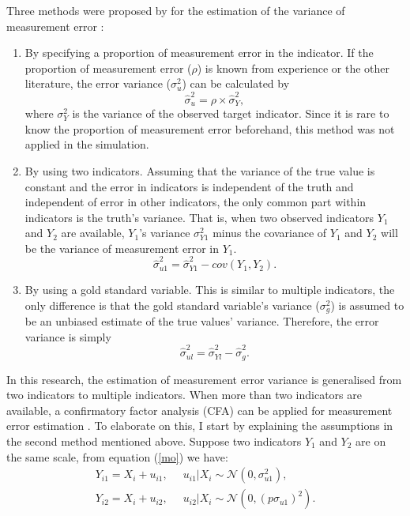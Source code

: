 \documentclass[oneside,a4paper]{article}
\begin{document}
Three methods were proposed by  for the estimation of the variance of measurement error : 
\begin{enumerate}
\item By specifying a proportion of measurement error in the indicator. If the proportion of measurement error ($\rho$) is known from experience or the other literature, the error variance ($\sigma_{u}^2$) can be calculated by 
\begin{equation}
\hat{\sigma}_{u}^2 = \rho \times \hat{\sigma}_Y^2,
\end{equation}
where $\sigma_Y^2$ is the variance of the observed target indicator. Since it is rare to know the proportion of measurement error beforehand, this method was not applied in the simulation.
\item By using two indicators. Assuming that the variance of the true value is constant and the error in indicators is independent of the truth and independent of error in other indicators, the only common part within indicators is the truth’s variance. That is, when two observed indicators $Y_1$ and $Y_2$ are available, $Y_1$’s variance $\sigma_{Y1}^2 $ minus the covariance of  $Y_1$ and $Y_2$ will be the variance of measurement error in $Y_1$.
\begin{equation}
\hat{\sigma}_{u1}^2 = \hat{\sigma}_{Y1}^2 - cov(Y_{1},Y_{2}).
\end{equation}
\item By using a gold standard variable. This is similar to multiple indicators, the only difference is that the gold standard variable’s variance ($\sigma_g^2$)  is assumed to be an unbiased estimate of the true values’ variance. Therefore, the error variance is simply
\begin{equation}
\hat{\sigma}_{ul}^2 = \hat{\sigma}_{Yl}^2 - \hat{\sigma}_g^2.
\end{equation}
\end{enumerate}
In this research, the estimation of measurement error variance is generalised from two indicators to multiple indicators. When more than two indicators are available, a confirmatory factor analysis (CFA) can be applied for measurement error estimation \cite{SEM}. To elaborate on this, I start by explaining the assumptions in the second method mentioned above. Suppose two indicators $Y_1$ and $Y_2$ are on the same scale, from equation (\ref{mo}) we have:
\begin{equation}\label{ind}
\begin{split}
Y_{i1} = X_{i}+ u_{i1}, \; \;
&u_{i1} | X_{i}  \sim \mathcal{N}(0,\sigma_{u1}^2), \\
Y_{i2} = X_{i} + u_{i2}, \; \;
&u_{i2} | X_{i}  \sim \mathcal{N}(0, (p\sigma_{u1})^2).
\end{split}
\end{equation}
\end{document}

